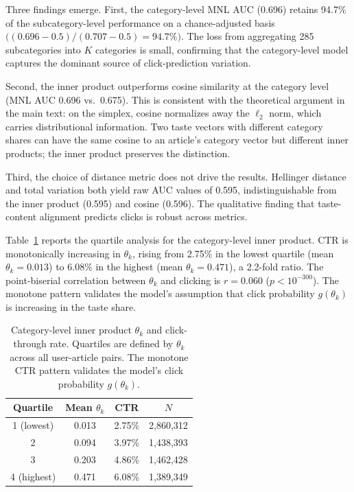 \documentclass[11pt]{article}
\begin{document}
Three findings emerge. First, the category-level MNL AUC (0.696) retains 94.7\% of the subcategory-level performance on a chance-adjusted basis $\bigl((0.696-0.5)/(0.707-0.5) = 94.7\%\bigr)$. The loss from aggregating 285 subcategories into $K$ categories is small, confirming that the category-level model captures the dominant source of click-prediction variation.

Second, the inner product outperforms cosine similarity at the category level (MNL AUC 0.696 vs.\ 0.675). This is consistent with the theoretical argument in the main text: on the simplex, cosine normalizes away the $\ell_2$ norm, which carries distributional information. Two taste vectors with different category shares can have the same cosine to an article's category vector but different inner products; the inner product preserves the distinction.

Third, the choice of distance metric does not drive the results. Hellinger distance and total variation both yield raw AUC values of 0.595, indistinguishable from the inner product (0.595) and cosine (0.596). The qualitative finding that taste-content alignment predicts clicks is robust across metrics.

Table~\ref{tab:cat_quintile} reports the quartile analysis for the category-level inner product. CTR is monotonically increasing in $\theta_k$, rising from 2.75\% in the lowest quartile (mean $\theta_k = 0.013$) to 6.08\% in the highest (mean $\theta_k = 0.471$), a 2.2-fold ratio. The point-biserial correlation between $\theta_k$ and clicking is $r = 0.060$ ($p < 10^{-300}$). The monotone pattern validates the model's assumption that click probability $g(\theta_k)$ is increasing in the taste share.

\begin{table}[ht]
\centering
\caption{Category-level inner product $\theta_k$ and click-through rate. Quartiles are defined by $\theta_k$ across all user-article pairs. The monotone CTR pattern validates the model's click probability $g(\theta_k)$.}
\label{tab:cat_quintile}
\begin{tabular}{cccc}
\toprule
Quartile & Mean $\theta_k$ & CTR & $N$ \\
\midrule
1 (lowest) & 0.013 & 2.75\% & 2,860,312 \\
2 & 0.094 & 3.97\% & 1,438,393 \\
3 & 0.203 & 4.86\% & 1,462,428 \\
4 (highest) & 0.471 & 6.08\% & 1,389,349 \\
\bottomrule
\end{tabular}
\end{table}
\FloatBarrier
\end{document}
